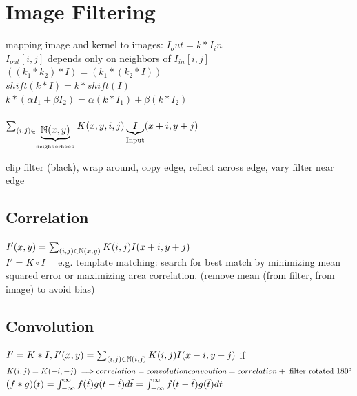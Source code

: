 \section{Image Filtering}
 mapping image and kernel to images: $I_out = k * I_in$\\
$I_{out}[i, j]$ depends only on neighbors of $I_{in}[i,j]$\\
 $((k_1 * k_2) * I) = (k_1 * (k_2 * I))$\\
 $shift(k * I) = k * shift(I)$\\
 $k * (\alpha I_1 + \beta I_2) = \alpha (k * I_1) + \beta (k * I_2)$\\
 \\
$\sum_{\begin{subarray}{c}
    (i, j) \in \underbrace{\mathbb{N}(x, y)}_{\text{neighborhood}}
\end{subarray}}
K(x, y, i, j) \underbrace{I}_{\text{Input}} (x + i, y + j)$

 clip filter (black), wrap around, copy edge, reflect across edge, vary filter near edge
\subsection*{Correlation}
$I'(x, y) = \sum_{(i, j) \in \mathbb{N}(x, y)} K(i, j) I (x + i, y + j)$ \\
$I' = K \circ I \quad$ e.g. template matching: search for best match by minimizing mean squared error or maximizing area correlation. (remove mean (from filter, from image) to avoid bias)
\subsection*{Convolution}
$I' = K * I, I'(x, y) = \sum_{(i, j) \in \mathbb{N}(i, j)} K(i, j) I (x - i, y - j)$ if $K(i, j) = K (-i, -j) \implies \\
correlation = convolution \quad\\
convoution = correlation + \text{ filter rotated 180°}$\\
 $(f * g)(t) \\
= \int_{-\infty}^{\infty} f(\tilde{t}) g(t - \tilde{t}) d\tilde{t}\\
= \int_{-\infty}^{\infty} f(t - \tilde{t}) g(\tilde{t}) dt$
